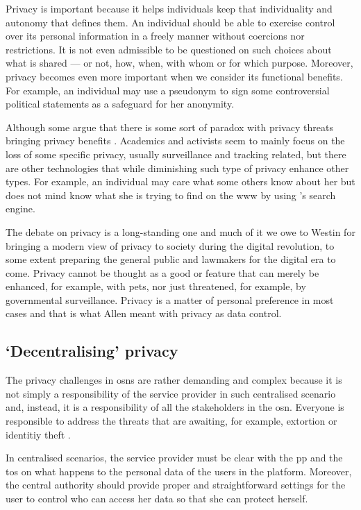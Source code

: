 \documentclass[showtrims, oldfontcommands]{kthesis}
\begin{document}
Privacy is important because it helps individuals keep that individuality and autonomy 
that defines them. An individual should be able to exercise control over its personal 
information in a freely manner without coercions nor restrictions. It is not even 
admissible to be questioned on such choices about what is shared --- or not, how, 
when, with whom or for which purpose. Moreover, privacy becomes even more important 
when we consider its functional benefits. For example, an individual may use a pseudonym 
to sign some controversial political statements as a safeguard for her anonymity.

Although some argue that there is some sort of paradox with privacy threats bringing 
privacy benefits \cite{WittesL15}. Academics and activists seem to mainly focus 
on the loss of some specific privacy, usually surveillance and tracking related, 
but there are other technologies that while diminishing such type of privacy enhance 
other types. For example, an individual may care what some others know about her 
but does not mind \Google know what she is trying to find on the \ac{www} by using 
\Google's search engine.

The debate on privacy is a long-standing one and much of it we owe to Westin for 
bringing a modern view of privacy to society during the digital revolution, to some 
extent preparing the general public and lawmakers for the digital era to come. Privacy 
cannot be thought as a good or feature that can merely be enhanced, for example, 
with \acp{pet}, nor just threatened, for example, by governmental surveillance. 
Privacy is a matter of personal preference in most cases and that is what Allen 
meant with privacy as data control.

\subsection{`Decentralising' privacy}
    \label{subsection:decentralising-privacy}
The privacy challenges in \acp{osn} are rather demanding and complex because it is 
not simply a responsibility of the service provider in such centralised scenario 
and, instead, it is a responsibility of all the stakeholders in the \ac{osn}. Everyone  
is responsible to address the threats that are awaiting, for example, extortion 
or identitiy theft \cite{GrossAH05}. 

In centralised scenarios, the service provider must be clear with the \ac{pp} and 
the \ac{tos} on what happens to the personal data of the users in the platform. 
Moreover, the central authority should provide proper and straightforward settings 
for the user to control who can access her data so that she can protect herself. 
\end{document}
